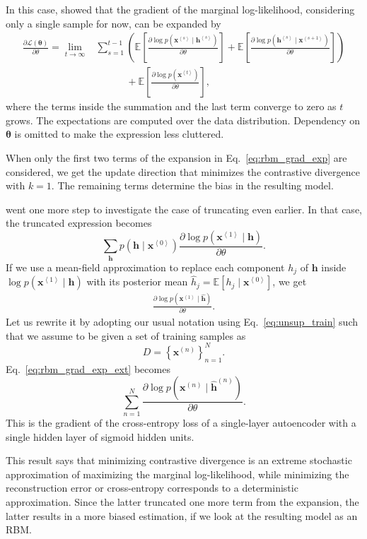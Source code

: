 \documentclass{now}
\newcommand{\qt}[1]{\left<#1\right>}
\newcommand{\vect}[1]{\mathbf{#1}}
\newcommand{\vects}[1]{\boldsymbol{#1}}
\newcommand{\vh}[0]{\vect{h}}
\newcommand{\vx}[0]{\vect{x}}
\newcommand{\TT}[0]{{\vects{\theta}}}
\newcommand{\LL}[0]{\mathcal{L}}
\newcommand{\E}[0]{\mathbb{E}}
\begin{document}
In this case, \citet{Bengio2009} showed that the gradient of the marginal
log-likelihood, considering only a single sample for now, can be expanded by
\begin{align}
    \label{eq:rbm_grad_exp}
    \frac{\partial \LL(\TT)}{\partial \theta} = 
    \lim_{t\to\infty}&
    \sum_{s=1}^{t-1} \left( \E\left[ \frac{\partial \log
    p(\vx^{\qt{s}} \mid \vh^{\qt{s}})}{\partial \theta}
    \right]  + \E \left[ \frac{\partial \log p(\vh^{\qt{s}}
    \mid \vx^{\qt{s+1}} )}{\partial \theta} \right]
    \right) 
    \nonumber \\
    &\phantom{\sum_{s=1}^{t-1}} + \E \left[ \frac{\partial \log
    p(\vx^{\qt{t}})}{\partial \theta} 
    \right],
\end{align}
where the terms inside the summation and the last term converge to zero as $t$
grows. The expectations are computed over the data distribution. Dependency on
$\TT$ is omitted to make the expression less cluttered.

When only the first two terms of the expansion in Eq.~\eqref{eq:rbm_grad_exp}
are considered, we get the update direction that minimizes the contrastive
divergence with $k=1$.  The remaining terms determine the bias in the resulting
model.

\citet{Bengio2009} went one more step to investigate the case of truncating even
earlier. In that case, the truncated expression becomes
\[
\sum_{\vh} p(\vh \mid \vx^{\qt{0}}) \frac{\partial \log
p(\vx^{\qt{1}} \mid \vh)}{\partial \theta}.
\]
If we use a mean-field approximation to replace each component $h_j$ of $\vh$
inside $\log p(\vx^{\qt{1}} \mid \vh)$ with its posterior mean $\hat{h}_j =
\E\left[ h_j \mid \vx^{\qt{0}} \right]$, we get
\begin{align}
    \label{eq:rbm_grad_exp_ext}
    \frac{\partial \log p(\vx^{\qt{1}} \mid \hat{\vh})}{\partial \theta}.
\end{align}
Let us rewrite it by adopting our usual notation using
Eq.~\eqref{eq:unsup_train} such that we assume to be given a set of training
samples as
\[
D=\left\{ \vx^{(n)} \right\}_{n=1}^N.
\]
Eq.~\eqref{eq:rbm_grad_exp_ext} becomes
\[
\sum_{n=1}^N \frac{\partial \log p(\vx^{(n)} \mid
\hat{\vh}^{(n)})}{\partial \theta}.
\]
This is the gradient of the cross-entropy loss of a single-layer autoencoder
with a single hidden layer of sigmoid hidden units.

This result says that minimizing contrastive divergence is an extreme stochastic
approximation of maximizing the marginal log-likelihood, while minimizing the
reconstruction error or cross-entropy corresponds to a deterministic
approximation. Since the latter truncated one more term from the expansion, the
latter results in a more biased estimation, if we look at the resulting model as
an RBM. 
\end{document}
